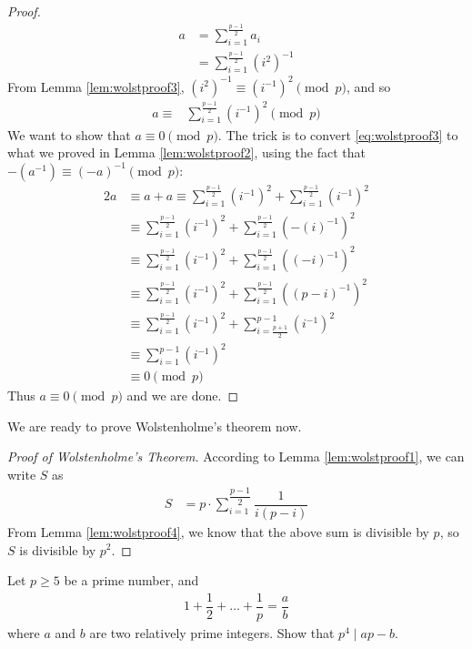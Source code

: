 \documentclass[12pt]{subfile}
\begin{document}
\begin{proof}
				\begin{align*}
					a
						& = \sum_{i=1}^{\frac{p-1}{2}} a_i\\
						& = \sum_{i=1}^{\frac{p-1}{2}} (i^2)^{-1}
				\end{align*}
			From Lemma \ref{lem:wolstproof3},  $(i^2)^{-1} \equiv (i^{-1})^{2} \pmod p$, and so
				\begin{align}\label{eq:wolstproof3}
					a \equiv
						& \sum_{i=1}^{\frac{p-1}{2}} (i^{-1})^{2} \pmod p
				\end{align}
			We want to show that $a \equiv 0 \pmod p$. The trick is to convert \eqref{eq:wolstproof3} to what we proved in Lemma \ref{lem:wolstproof2}, using the fact that $-(a^{-1}) \equiv (-a)^{-1} \pmod p$:
				\begin{align*}
					2a
						&\equiv a+a \equiv \sum_{i=1}^{\frac{p-1}{2}} (i^{-1})^{2} + \sum_{i=1}^{\frac{p-1}{2}} (i^{-1})^{2}\\
						& \equiv \sum_{i=1}^{\frac{p-1}{2}} (i^{-1})^{2} + \sum_{i=1}^{\frac{p-1}{2}} (-(i)^{-1})^{2}  \\
						&\equiv \sum_{i=1}^{\frac{p-1}{2}} (i^{-1})^{2} + \sum_{i=1}^{\frac{p-1}{2}} ((-i)^{-1})^{2}\\
						& \equiv \sum_{i=1}^{\frac{p-1}{2}} (i^{-1})^{2} + \sum_{i=1}^{\frac{p-1}{2}} ((p-i)^{-1})^{2}\\
						& \equiv \sum_{i=1}^{\frac{p-1}{2}} (i^{-1})^{2} + \sum_{i=\frac{p+1}{2}}^{p-1} (i^{-1})^{2}\\
						& \equiv \sum_{i=1}^{p-1} (i^{-1})^{2}\\
						& \equiv 0 \pmod p
				\end{align*}
			Thus $a \equiv 0 \pmod p$ and we are done.
		\end{proof}
	We are ready to prove Wolstenholme's theorem now.
		\begin{proof}[Proof of Wolstenholme's Theorem]
			According to Lemma \ref{lem:wolstproof1}, we can write $S$ as
			\begin{align*}
				S
					& = p \cdot \sum_{i=1}^{\dfrac{p-1}{2}} \dfrac{1}{i(p-i)}
			\end{align*}
			From Lemma \ref{lem:wolstproof4}, we know that the above sum is divisible by $p$, so $S$ is divisible by $p^2$.
		\end{proof}

		\begin{problem}
			Let $p \geq 5$ be a prime number, and
				\begin{align*}
					1 + \dfrac{1}{2} + \ldots + \dfrac{1}{p}=\dfrac{a}{b}
				\end{align*}
			where $a$ and $b$ are two relatively prime integers. Show that $p^4\mid ap-b$.
		\end{problem}
\end{document}
